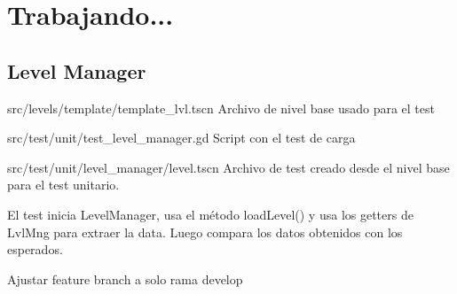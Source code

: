 
\section{Trabajando...}\label{Trabajando}

\subsection{Level Manager}

src/levels/template/template\_lvl.tscn Archivo de nivel base usado para el test

src/test/unit/test\_level\_manager.gd Script con el test de carga

src/test/unit/level\_manager/level.tscn Archivo de test creado desde el nivel base para el test unitario.

El test inicia LevelManager, usa el método loadLevel() y usa los getters de LvlMng para extraer la data. Luego compara los datos obtenidos con los esperados.

\pagebreak

Ajustar feature branch a solo rama develop
